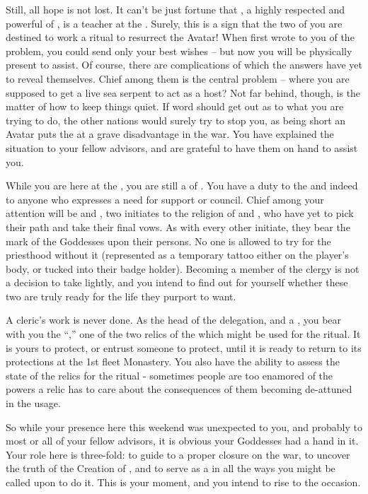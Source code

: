 \documentclass[char]{GL2020}
\begin{document}
Still, all hope is not lost. It can't be just fortune that \cFlowPriest{}, a highly respected and powerful \cFlowPriest{\cleric} of \cFlowFull{\full}, is a teacher at the \pSchool{}. Surely, this is a sign that the two of you are destined to work a ritual to resurrect the Avatar! When \cFlowPriest{} first wrote to you of the problem, you could send only your best wishes -- but now you will be physically present to assist. Of course, there are complications of which the answers have yet to reveal themselves. Chief among them is the central problem – where you are supposed to get a live sea serpent to act as a host? Not far behind, though, is the matter of how to keep things quiet. If word should get out as to what you are trying to do, the other nations would surely try to stop you, as being short an Avatar puts the \pShippies{} at a grave disadvantage in the war. You have explained the situation to your fellow \pShip{} advisors, and are grateful to have them on hand to assist you.

While you are here at the \pSc{}, you are still a \cEbbPriest{\cleric} of \cEbb{}. You have a duty to the \pShippies{} and indeed to anyone who expresses a need for support or council. Chief among your attention will be \cInitiate{\full} and \cWarlordDaughter{}, two initiates to the religion of \cEbb{} and \cFlow{}, who have yet to pick their path and take their final vows. As with every other initiate, they bear the mark of the Goddesses upon their persons. No one is allowed to try for the priesthood without it (represented as a temporary tattoo either on the player's body, or tucked into their badge holder). Becoming a member of the clergy is not a decision to take lightly, and you intend to find out for yourself whether these two are truly ready for the life they purport to want. 

A cleric's work is never done. As the head of the delegation, and a \cEbbPriest{\cleric}, you bear with you the ``\iChalice{},'' one of the two relics of the \pShip{} which might be used for the ritual. It is yours to protect, or entrust someone to protect, until it is ready to return to its protections at the 1st fleet Monastery. You also have the ability to assess the state of the relics for the ritual - sometimes people are too enamored of the powers a relic has to care about the consequences of them becoming de-attuned in the usage.

So while your presence here this weekend was unexpected to you, and probably to most or all of your fellow advisors, it is obvious your Goddesses had a hand in it. Your role here is three-fold: to guide \pEarth{} to a proper closure on the war, to uncover the truth of the Creation of \pEarth{}, and to serve as a \cEbbPriest{\cleric} in all the ways you might be called upon to do it. This is your moment, and you intend to rise to the occasion.
\end{document}
